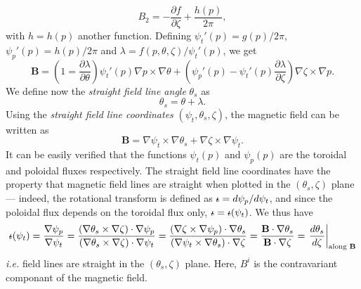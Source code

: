 \begin{equation}
	B_2 = -\frac{\partial f}{\partial \zeta} + \frac{h(p)}{2\pi},
\end{equation}
with $h=h(p)$ another function. Defining $\psi_t'(p)=g(p)/2\pi$, $\psi_p'(p)=h(p)/2\pi$ and $\lambda=f(p,\theta,\zeta)/\psi_t'(p)$, we get
\begin{equation}
	\mathbf{B} = \left(1=\frac{\partial\lambda}{\partial\theta}\right)\psi_t'(p)\nabla p\times\nabla\theta + \left(\psi_p'(p)-\psi_t'(p)\frac{\partial\lambda}{\partial\zeta}\right)\nabla\zeta\times\nabla p.
\end{equation}
We define now the \emph{straight field line angle} $\theta_s$ as 
\begin{equation}
	\theta_s = \theta + \lambda.
\end{equation}
Using the \emph{straight field line coordinates} $(\psi_t,\theta_s,\zeta)$, the magnetic field can be written as
\begin{equation}
	\mathbf{B}=\nabla\psi_t\times\nabla\theta_s + \nabla\zeta\times\nabla\psi_t. \label{eq.magnetic field covariant}
\end{equation}
It can be easily verified that the functions $\psi_t(p)$ and $\psi_p(p)$ are the toroidal and poloidal fluxes respectively. The straight field line coordinates have the property that magnetic field lines are straight when plotted in the $(\theta_s,\zeta)$ plane --- indeed, the rotational transform is defined as $\text{$\iota\!\!$-}=d\psi_p/d\psi_t$, and since the poloidal flux depends on the toroidal flux only, $\text{$\iota\!\!$-}=\text{$\iota\!\!$-}(\psi_t)$. We thus have
\begin{equation}
	\text{$\iota\!\!$-}(\psi_t) = \frac{\nabla\psi_p}{\nabla\psi_t} = \frac{(\nabla\theta_s\times\nabla\zeta)\cdot\nabla\psi_p}{(\nabla\theta_s\times\nabla\zeta)\cdot\nabla\psi_t} = \frac{(\nabla\zeta\times\nabla\psi_p)\cdot\nabla\theta_s}{(\nabla\psi_t\times\nabla\theta_s)\cdot\nabla\zeta} = \frac{\mathbf{B}\cdot\nabla\theta_s}{\mathbf{B}\cdot\nabla\zeta} = \left.\frac{d\theta_s}{d\zeta}\right|_{\text{along }\mathbf{B}}
\end{equation}
\textit{i.e.} field lines are straight in the $(\theta_s,\zeta)$ plane. Here, $B^i$ is the contravariant componant of the magnetic field.

